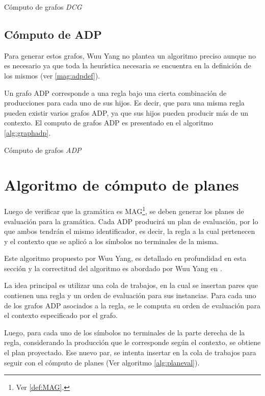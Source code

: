 \begin{algorithm}[!ht]

\caption{\label{alg:graphdcg} Cómputo de grafos \textit{DCG}}
\end{algorithm}

\subsection{Cómputo de ADP}
\label{subsec:alg-ADP} 
Para generar estos grafos, Wuu Yang no plantea un algoritmo preciso aunque no es necesario ya que toda la heurística necesaria se encuentra en la definición de los mismos (ver \ref{mag:adpdef}).

Un grafo ADP corresponde a una regla bajo una cierta combinación de producciones para cada uno de sus hijos. Es decir, que para una misma regla pueden existir varios grafos ADP, ya que sus hijos pueden producir más de un contexto. El computo de grafos ADP es presentado en el algoritmo \ref{alg:graphadp}.

\begin{algorithm}[!ht]

\caption{\label{alg:graphadp} Cómputo de grafos \textit{ADP}}
\end{algorithm}

\section{Algoritmo de cómputo de planes}
\label{sec:comp-planes}
Luego de verificar que la gramática es MAG\footnote{Ver \ref{def:MAG}.}, se deben generar los planes de evaluación para la gramática. Cada ADP producirá un plan de evaluación, por lo que ambos tendrán el mismo identificador, es decir, la regla a la cual pertenecen y el contexto que se aplicó a los símbolos no terminales de la misma.

Este algoritmo propuesto por Wuu Yang, es detallado en profundidad en esta sección y la correctitud del algoritmo es abordado por Wuu Yang en \cite{wuu-yang1}.

La idea principal es utilizar una cola de trabajos, en la cual se insertan pares que contienen una regla y un orden de evaluación para sus instancias. Para cada uno de los grafos ADP asociados a la regla, se le computa su orden de evaluación para el contexto especificado por el grafo.

Luego, para cada uno de los símbolos no terminales de la parte derecha de la regla, considerando la producción que le corresponde según el contexto, se obtiene el plan proyectado. Ese nuevo par, se intenta insertar en la cola de trabajos para seguir con el cómputo de planes (Ver algoritmo \ref{alg:planeval}).

